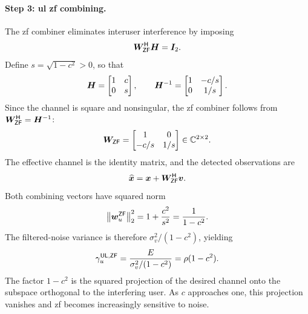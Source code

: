 \paragraph{Step 3: \ac{ul} \ac{zf} combining.}
The \ac{zf} combiner eliminates interuser interference by imposing
\begin{equation*}
	{\bm{W}}^{\mathsf{H}}_{\mathsf{ZF}}\bm{H}=\bm{I}_2.
\end{equation*}
Define $s=\sqrt{1-c^2}>0$, so that
\begin{equation*}
	\bm{H}=\begin{bmatrix}1&c\\0&s\end{bmatrix},
	\qquad
	{\bm{H}}^{-1}=\begin{bmatrix}1&-c/s\\0&1/s\end{bmatrix}.
\end{equation*}
Since the channel is square and nonsingular, the \ac{zf} combiner follows from ${\bm{W}}^{\mathsf{H}}_{\mathsf{ZF}}={\bm{H}}^{-1}$:
\begin{equation}
	\bm{W}_{\mathsf{ZF}}
	=\begin{bmatrix}1&0\\-c/s&1/s\end{bmatrix}
	\in\mathbb{C}^{2\times2}.
	\label{eq06:mu-zf}
\end{equation}
The effective channel is the identity matrix, and the detected observations are
\begin{equation*}
	\widehat{\bm{x}}
	=\bm{x}+{\bm{W}}^{\mathsf{H}}_{\mathsf{ZF}}\bm{v}.
\end{equation*}
Both combining vectors have squared norm
\begin{equation*}
	\left\|\bm{w}_u^{\mathsf{ZF}}\right\|_2^2
	=1+\frac{c^2}{s^2}
	=\frac{1}{1-c^2}.
\end{equation*}
The filtered-noise variance is therefore $\sigma_v^2/(1-c^2)$, yielding
\begin{equation}
	\gamma_u^{\mathsf{UL},\mathsf{ZF}}
	=\frac{E}{\sigma_v^2/(1-c^2)}
	=\rho(1-c^2).
	\label{eq06:mu-zf-sinr}
\end{equation}
The factor $1-c^2$ is the squared projection of the desired channel onto the subspace orthogonal to the interfering user. As $c$ approaches one, this projection vanishes and \ac{zf} becomes increasingly sensitive to noise.

